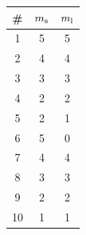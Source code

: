 \begin{tabular}{ccc}
  \hline
  \# & $m_{\rm s}$ & $m_{\rm l}$\\\hline
1 & 5 & 5\\
2 & 4 & 4\\
3 & 3 & 3\\
4 & 2 & 2\\
5 & 2 & 1\\
6 & 5 & 0\\
7 & 4 & 4\\
8 & 3 & 3\\
9 & 2 & 2\\
10 & 1 & 1\\
\hline
\end{tabular}
